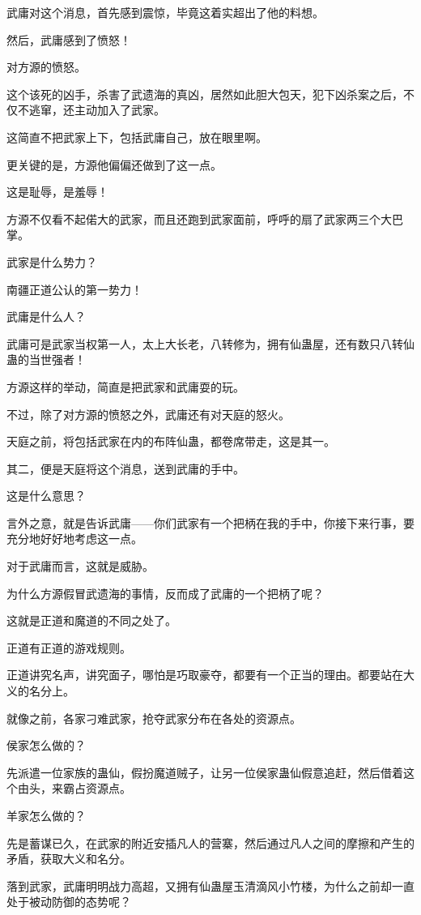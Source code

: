 \begin{this_body}
武庸对这个消息，首先感到震惊，毕竟这着实超出了他的料想。

然后，武庸感到了愤怒！

对方源的愤怒。

这个该死的凶手，杀害了武遗海的真凶，居然如此胆大包天，犯下凶杀案之后，不仅不逃窜，还主动加入了武家。

这简直不把武家上下，包括武庸自己，放在眼里啊。

更关键的是，方源他偏偏还做到了这一点。

这是耻辱，是羞辱！

方源不仅看不起偌大的武家，而且还跑到武家面前，呼呼的扇了武家两三个大巴掌。

武家是什么势力？

南疆正道公认的第一势力！

武庸是什么人？

武庸可是武家当权第一人，太上大长老，八转修为，拥有仙蛊屋，还有数只八转仙蛊的当世强者！

方源这样的举动，简直是把武家和武庸耍的玩。

不过，除了对方源的愤怒之外，武庸还有对天庭的怒火。

天庭之前，将包括武家在内的布阵仙蛊，都卷席带走，这是其一。

其二，便是天庭将这个消息，送到武庸的手中。

这是什么意思？

言外之意，就是告诉武庸——你们武家有一个把柄在我的手中，你接下来行事，要充分地好好地考虑这一点。

对于武庸而言，这就是威胁。

为什么方源假冒武遗海的事情，反而成了武庸的一个把柄了呢？

这就是正道和魔道的不同之处了。

正道有正道的游戏规则。

正道讲究名声，讲究面子，哪怕是巧取豪夺，都要有一个正当的理由。都要站在大义的名分上。

就像之前，各家刁难武家，抢夺武家分布在各处的资源点。

侯家怎么做的？

先派遣一位家族的蛊仙，假扮魔道贼子，让另一位侯家蛊仙假意追赶，然后借着这个由头，来霸占资源点。

羊家怎么做的？

先是蓄谋已久，在武家的附近安插凡人的营寨，然后通过凡人之间的摩擦和产生的矛盾，获取大义和名分。

落到武家，武庸明明战力高超，又拥有仙蛊屋玉清滴风小竹楼，为什么之前却一直处于被动防御的态势呢？


\end{this_body}
